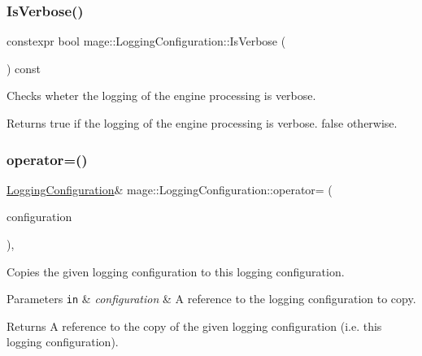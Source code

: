 \subsubsection{\texorpdfstring{Is\+Verbose()}{IsVerbose()}}
{\footnotesize\ttfamily constexpr bool mage\+::\+Logging\+Configuration\+::\+Is\+Verbose (\begin{DoxyParamCaption}{ }\end{DoxyParamCaption}) const\hspace{0.3cm}{\ttfamily [noexcept]}}

Checks wheter the logging of the engine processing is verbose.

\begin{DoxyReturn}{Returns}
{\ttfamily true} if the logging of the engine processing is verbose. {\ttfamily false} otherwise. 
\end{DoxyReturn}
\mbox{\label{classmage_1_1_logging_configuration_a84fe9acca976ad1690a4848235a8a079}} 
\subsubsection{\texorpdfstring{operator=()}{operator=()}\hspace{0.1cm}{\footnotesize\ttfamily [1/2]}}
{\footnotesize\ttfamily \mbox{\hyperlink{classmage_1_1_logging_configuration}{Logging\+Configuration}}\& mage\+::\+Logging\+Configuration\+::operator= (\begin{DoxyParamCaption}\item[{const \mbox{\hyperlink{classmage_1_1_logging_configuration}{Logging\+Configuration}} \&}]{configuration }\end{DoxyParamCaption})\hspace{0.3cm}{\ttfamily [default]}, {\ttfamily [noexcept]}}

Copies the given logging configuration to this logging configuration.


\begin{DoxyParams}[1]{Parameters}
\mbox{\tt in}  & {\em configuration} & A reference to the logging configuration to copy. \\
\hline
\end{DoxyParams}
\begin{DoxyReturn}{Returns}
A reference to the copy of the given logging configuration (i.\+e. this logging configuration). 
\end{DoxyReturn}
\mbox{\label{classmage_1_1_logging_configuration_abd5b991b7461e52cce5a9787ee3e1955}} 
